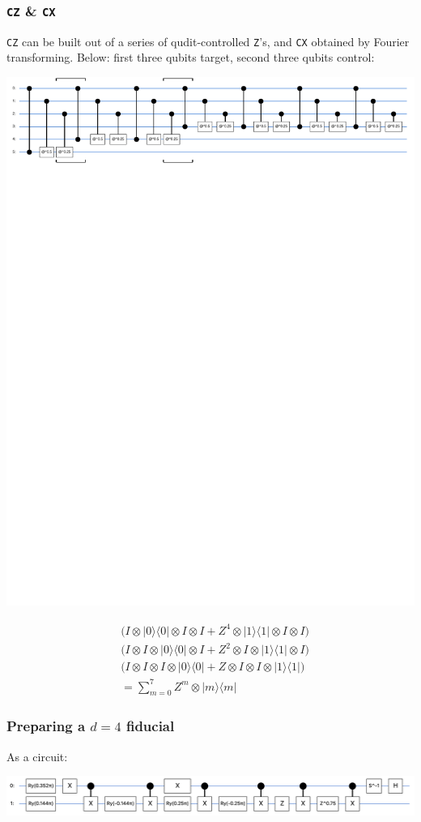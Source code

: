 \documentclass{beamer}
\newcommand{\T}[1]{\texttt{#1}}
\begin{document}
\begin{frame}
\frametitle{\T{CZ} \& \T{CX}}
\T{CZ} can be built out of a series of qudit-controlled \T{Z}'s, and \T{CX} obtained by Fourier transforming. Below: first three qubits target, second three qubits control:
\begin{center}
\includegraphics[scale=0.5]{img/controlled_clock.pdf}
\end{center}	
\begin{align*}
&\Big(I\otimes|0\rangle\langle0|\otimes I\otimes I + Z^4\otimes |1\rangle\langle 1| \otimes I \otimes I\Big)\\
&\Big(I\otimes I\otimes |0\rangle\langle 0| \otimes I+Z^2\otimes I\otimes |1\rangle\langle 1| \otimes I\Big)\\
&\Big(I\otimes I\otimes I\otimes |0\rangle\langle 0|+Z\otimes I\otimes I\otimes |1\rangle\langle 1|\Big)	\\
&=\sum_{m=0}^{7}Z^m \otimes |m\rangle\langle m| 
\end{align*}

\end{frame}

\begin{frame}
\frametitle{Preparing a $d=4$ fiducial}
As a circuit:
\begin{center}
 \includegraphics[scale=0.28]{img/fiducial_prep}
\end{center}   
   \end{frame}
\end{document}
